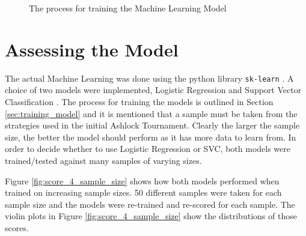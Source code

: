 \begin{figure}
    \centering
    \caption{The process for training the Machine Learning Model}
    \label{fig:ml_process}
\end{figure}



\section{Assessing the Model}\label{sec:assessing_model}

The actual Machine Learning was done using the python library \texttt{sk-learn} \cite{scikit-learn}.
A choice of two models were implemented, Logistic Regression \cite{Schmidt2016, Yu2011} and Support Vector Classification \cite{Smola2004, Vandewalle1999}.
The process for training the models is outlined in Section \ref{sec:training_model} and it is mentioned that a sample must be taken from the strategies used in the initial Ashlock Tournament.
Clearly the larger the sample size, the better the model should perform as it has more data to learn from.
In order to decide whether to use Logistic Regression or SVC, both models were trained/tested against many samples of varying sizes.

Figure \ref{fig:score_4_sample_size} shows how both models performed when trained on increasing sample sizes.
50 different samples were taken for each sample size and the models were re-trained and re-scored for each sample.
The violin plots in Figure \ref{fig:score_4_sample_size} show the distributions of those scores.

